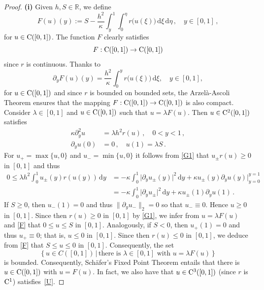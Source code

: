 \documentclass[reqno,11pt]{amsart}
\numberwithin{equation}{section}
\newcommand{\R}{\mathbb{R}}
\newcommand{\rd}{\mathrm{d}}
\begin{document}
\begin{proof}
{\bf (i)} Given $h,S\in\R$,  we define
\begin{equation}\label{F}
F(u)(y):=S-\frac{h^2}{\kappa}
  \int_y^1\int_0^\eta  r \bigl( u(\xi)\bigr)\,\rd\xi \,\rd \eta\,,\quad y\in [0,1]\,,
\end{equation}
for $u\in {\rm C}([0,1])$. The
function $F$ clearly satisfies
$$
F: {\rm C}([0,1])\rightarrow {\rm C}([0,1])
$$
since $ r$ is
continuous. Thanks to
\begin{equation}\label{i97}
\partial_y F(u)(y)=\frac{h^2}{\kappa} \int_0^y  r\bigl(
u(\xi)\bigr)\,\rd \xi,\quad y\in [0,1],
\end{equation}
for  $u\in {\rm C}([0,1])$ and since $r$ is bounded on bounded sets,
the Arzel\`a-Ascoli Theorem ensures that the mapping $F:
{\rm C}([0,1])\rightarrow {\rm C}([0,1])$ is also
compact. Consider $\lambda\in [0,1]$ and $u\in {\rm C}([0,1])$ such that $u=\lambda F(u)$. Then $u\in {\rm C}^2([0,1])$ satisfies
\begin{align*}
\kappa \partial_{y}^2u&= \lambda h^2r(u)\,,  \quad 0<y<1\,,\\
\partial_{y}u(0)&=0\,,\quad u(1)=\lambda S\,.
\end{align*}
For $u_+=\max\{u,0\}$ and $u_-=\min\{u,0\}$ it follows from \eqref{G1} that $u_\pm r(u)\ge 0$ in $[0,1]$ and thus
\begin{align*}
0\le \lambda h^2\int_0^1u_\pm(y) r(u(y))\,\rd y&=-\kappa\int_0^1\vert \partial_y u_\pm(y)\vert^2\,\rd y+\kappa u_\pm(y)\partial_yu(y)\big\vert_{y=0}^{y=1}\\
&=-\kappa\int_0^1\vert \partial_y u_\pm\vert^2\,\rd y+\kappa u_\pm(1)\partial_yu(1)\,.
\end{align*} 
If $S\ge 0$, then $u_-(1)=0$ and thus $\|\partial_y u_-\|_2=0$ so that $u_-\equiv 0$. Hence $u\ge 0$ in $[0,1]$. Since then $r(u)\ge 0$ in $[0,1]$ by \eqref{G1}, we infer from $u=\lambda F(u)$ and \eqref{F} that $0\le u\le S$ in $[0,1]$. Analogously, if $S< 0$, then $u_+(1)=0$ and thus  $u_+\equiv 0$; that is, $u\le 0$ in $[0,1]$. Since then $r(u)\le 0$ in $[0,1]$, we deduce from \eqref{F} that $S\le u\le 0$ in $[0,1]$. Consequently, the set
$$
\left\{u\in C([0,1])\, \big |\,  \text{there is } \lambda\in [0,1] \text { with }
u=\lambda F(u)\right\} 
$$
is bounded. Consequently, Sch\"afer's Fixed Point Theorem \cite[Theorem~11.3]{GT} entails that
there is $u\in {\rm C}([0,1])$ with $u=F(u)$. In fact, %
we also have that $u\in {\rm C}^3([0,1])$ (since $r$ is ${\rm C}^1$) satisfies~\eqref{U}.

\end{proof}
\end{document}
